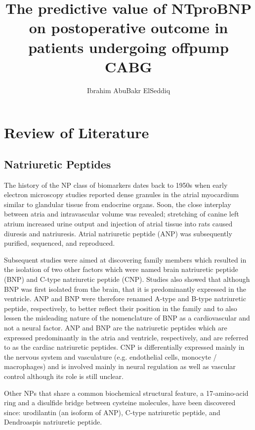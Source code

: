 \documentclass[14pt,a4paper,onecolumn]{extarticle}
\author{Ibrahim AbuBakr ElSeddiq}
\title{The predictive value of NTproBNP on postoperative outcome in patients undergoing offpump CABG}
\begin{document}
\maketitle
\clearpage
\clearpage
\section{Review of Literature}

\subsection{Natriuretic Peptides}


The history of the NP class of biomarkers dates back to 1950s when early electron microscopy studies reported dense granules in the atrial myocardium similar to glandular tissue from endocrine organs. Soon, the close interplay between atria and intravascular volume was revealed; stretching of canine left atrium increased urine output and injection of atrial tissue into rats caused diuresis and natriuresis. Atrial natriuretic peptide (ANP) was subsequently purified, sequenced, and reproduced. \citep{Gaggin2014}

Subsequent studies were aimed at discovering family members which resulted in the isolation of two other factors which were named brain natriuretic peptide (BNP) and C-type natriuretic peptide (CNP). Studies also showed that although BNP was first isolated from the brain, that it is predominantly expressed in the ventricle. ANP and BNP were therefore renamed A-type and B-type natriuretic peptide, respectively, to better reflect their position in the family and to also lessen the misleading nature of the nomenclature of BNP as a cardiovascular and not a neural factor. ANP and BNP are the natriuretic peptides which are expressed predominantly in the atria and ventricle, respectively, and are referred to as the cardiac natriuretic peptides. CNP is differentially expressed mainly in the nervous system and vasculature (e.g. endothelial cells, monocyte / macrophages) and is involved mainly in neural regulation as well as vascular control although its role is still unclear. \citep{Suzuki2001}

Other NPs that share a common biochemical structural feature, a 17-amino-acid ring and a disulfide bridge between cysteine molecules, have been discovered since: urodilantin (an isoform of ANP), C-type natriuretic peptide, and Dendroaspis natriuretic peptide. \citep{Gaggin2014}
\end{document}
